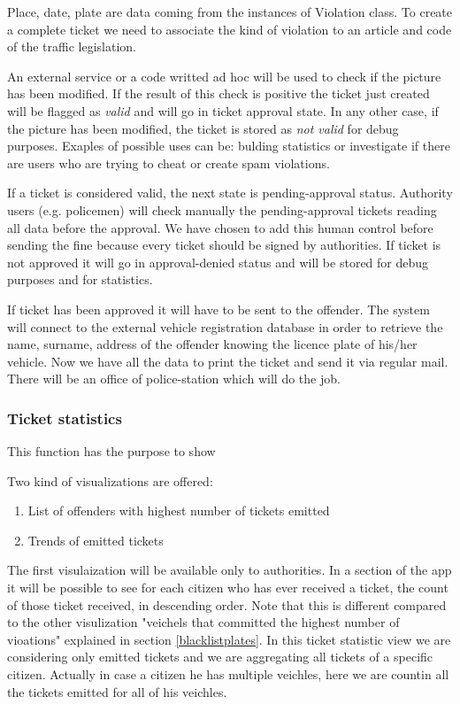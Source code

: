 Place, date, plate are data coming from the instances of Violation class. To create a complete ticket we need to associate the kind of violation to an article and code of the traffic legislation.

An external service or a code writted ad hoc will be used to check if the picture has been modified.
If the result of this check is positive the ticket just created will be flagged as \textit{valid} and will go in ticket approval state.
In any other case, if the picture has been modified, the ticket is stored as \textit{not valid} for debug purposes. Exaples of possible uses can be: bulding statistics or investigate if there are users who are trying to cheat or create spam violations.

If a ticket is considered valid, the next state is pending-approval status.
Authority users (e.g. policemen) will check manually the pending-approval tickets reading all data before the approval. We have chosen to add this human control before sending the fine because every ticket should be signed by authorities. If ticket is not approved it will go in approval-denied status and will be stored for debug purposes and for statistics.

If ticket has been approved it will have to be sent to the offender.
The system will connect to the external vehicle registration database in order to retrieve the name, surname, address of the offender knowing the licence plate of his/her vehicle.
Now we have all the data to print the ticket and send it via regular mail. There will be an office of police-station which will do the job.

\subsubsection{Ticket statistics}
This function has the purpose to show

Two kind of visualizations are offered:
\begin{enumerate}
  \item List of offenders with highest number of tickets emitted
  \item Trends of emitted tickets
\end{enumerate}

The first visulaization will be available only to authorities. In a section of the app it will be possible to see for each citizen who has ever received a ticket, the count of those ticket received, in descending order.  Note that this is different compared to the other visulization "veichels that committed the highest number of vioations" explained in section \ref{blacklistplates}.
In this ticket statistic view we are considering only emitted tickets and we are aggregating all tickets of a specific citizen. Actually in case a citizen he has multiple veichles, here we are countin all the tickets emitted for all of his veichles.

